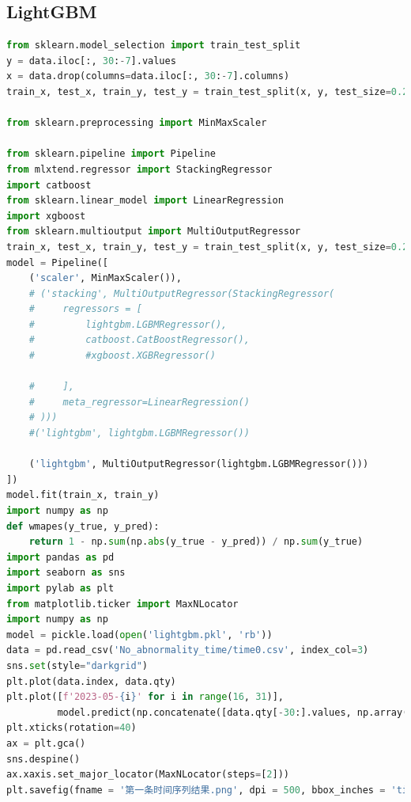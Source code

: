 \documentclass[withoutpreface,bwprint]{cumcmthesis}
\begin{document}
\subsection*{LightGBM}
\begin{lstlisting}[language=python]
from sklearn.model_selection import train_test_split
y = data.iloc[:, 30:-7].values
x = data.drop(columns=data.iloc[:, 30:-7].columns)
train_x, test_x, train_y, test_y = train_test_split(x, y, test_size=0.2)

from sklearn.preprocessing import MinMaxScaler

from sklearn.pipeline import Pipeline
from mlxtend.regressor import StackingRegressor
import catboost
from sklearn.linear_model import LinearRegression
import xgboost
from sklearn.multioutput import MultiOutputRegressor
train_x, test_x, train_y, test_y = train_test_split(x, y, test_size=0.2)
model = Pipeline([
    ('scaler', MinMaxScaler()),
    # ('stacking', MultiOutputRegressor(StackingRegressor(
    #     regressors = [
    #         lightgbm.LGBMRegressor(), 
    #         catboost.CatBoostRegressor(), 
    #         #xgboost.XGBRegressor()
            
    #     ], 
    #     meta_regressor=LinearRegression()
    # )))
    #('lightgbm', lightgbm.LGBMRegressor())

    ('lightgbm', MultiOutputRegressor(lightgbm.LGBMRegressor()))
])
model.fit(train_x, train_y)
import numpy as np
def wmapes(y_true, y_pred):
    return 1 - np.sum(np.abs(y_true - y_pred)) / np.sum(y_true)
import pandas as pd
import seaborn as sns
import pylab as plt
from matplotlib.ticker import MaxNLocator
import numpy as np
model = pickle.load(open('lightgbm.pkl', 'rb'))
data = pd.read_csv('No_abnormality_time/time0.csv', index_col=3)
sns.set(style="darkgrid")
plt.plot(data.index, data.qty)
plt.plot([f'2023-05-{i}' for i in range(16, 31)], 
         model.predict(np.concatenate([data.qty[-30:].values, np.array([1, 0, 0, 0, 0, 0, 0])]).reshape(1, -1))[0])
plt.xticks(rotation=40)
ax = plt.gca()
sns.despine()
ax.xaxis.set_major_locator(MaxNLocator(steps=[2]))
plt.savefig(fname = '第一条时间序列结果.png', dpi = 500, bbox_inches = 'tight', pad_inches = 0.0)
\end{lstlisting}
\end{document}
